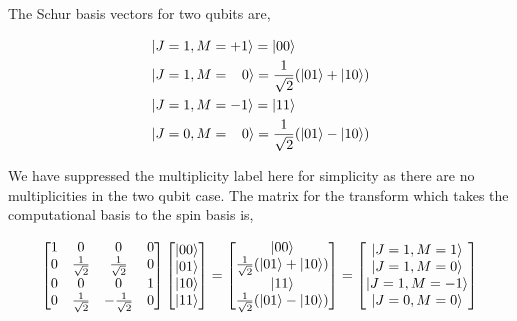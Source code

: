 \documentclass[12pt]{article}
\begin{document}
The Schur basis vectors for two qubits are,

\begin{subequations}
\begin{align}
\begin{split}
&\left\vert{J=1, M=+1}\right\rangle = \left\vert{00}\right\rangle \\
&\left\vert{J=1, M=\;\;\;0}\right\rangle = \frac{1}{\sqrt{2}}(\left\vert{01}\right\rangle + \left\vert{10}\right\rangle) \\
&\left\vert{J=1, M=-1}\right\rangle = \left\vert{11}\right\rangle \\
\end{split}\\
\begin{split}
&\left\vert{J=0, M=\;\;\;0}\right\rangle = \frac{1}{\sqrt{2}}(\left\vert{01}\right\rangle - \left\vert{10}\right\rangle)\\
\end{split}
\end{align}
\end{subequations}

We have suppressed the multiplicity label here for simplicity as there are no multiplicities in the two qubit case. The matrix for the transform which takes the computational basis to the spin basis is,

\begin{align}
\begin{bmatrix}
1 & 0 & 0 & 0 \\
0 & \frac{1}{\sqrt{2}} & \frac{1}{\sqrt{2}} & 0 \\
0 & 0 & 0 & 1 \\
0 & \frac{1}{\sqrt{2}} & -\frac{1}{\sqrt{2}} & 0 \\
\end{bmatrix}
\begin{bmatrix}
\left\vert{00}\right\rangle \\
\left\vert{01}\right\rangle \\
\left\vert{10}\right\rangle \\
\left\vert{11}\right\rangle \\ 
\end{bmatrix}
=
\begin{bmatrix}
\left\vert{00}\right\rangle \\
\frac{1}{\sqrt{2}}(\left\vert{01}\right\rangle + \left\vert{10}\right\rangle) \\
\left\vert{11}\right\rangle \\
\frac{1}{\sqrt{2}}(\left\vert{01}\right\rangle - \left\vert{10}\right\rangle) \\ 
\end{bmatrix}
=
\begin{bmatrix}
\left\vert{J=1, M=1}\right\rangle \\
\left\vert{J=1, M=0}\right\rangle \\
\left\vert{J=1, M=-1}\right\rangle \\
\left\vert{J=0, M=0}\right\rangle \\ 
\end{bmatrix}
\end{align}
\end{document}
